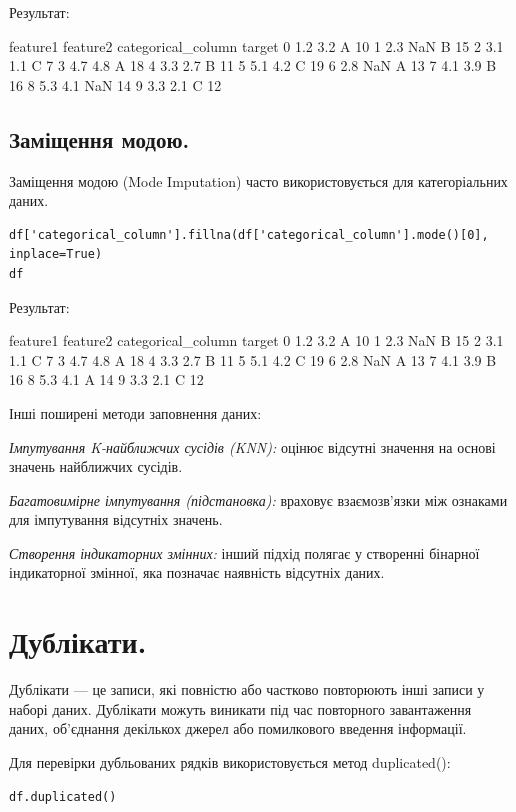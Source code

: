 Результат:

\begin{console}
	feature1	feature2	categorical_column	target
0	1.2	3.2	A	10
1	2.3	NaN	B	15
2	3.1	1.1	C	7
3	4.7	4.8	A	18
4	3.3	2.7	B	11
5	5.1	4.2	C	19
6	2.8	NaN	A	13
7	4.1	3.9	B	16
8	5.3	4.1	NaN	14
9	3.3	2.1	C	12
\end{console}

\subsection{Заміщення модою.} 

Заміщення модою (Mode Imputation) часто використовується для категоріальних даних.

\begin{lstlisting}
df['categorical_column'].fillna(df['categorical_column'].mode()[0], inplace=True)
df
\end{lstlisting}

Результат:

\begin{console}
feature1	feature2	categorical_column	target
0	1.2	3.2	A	10
1	2.3	NaN	B	15
2	3.1	1.1	C	7
3	4.7	4.8	A	18
4	3.3	2.7	B	11
5	5.1	4.2	C	19
6	2.8	NaN	A	13
7	4.1	3.9	B	16
8	5.3	4.1	A	14
9	3.3	2.1	C	12
\end{console}

 Інші поширені методи заповнення даних:

\textit{Імпутування K-найближчих сусідів (KNN):} оцінює відсутні значення на основі значень найближчих 
сусідів.

\textit{Багатовимірне імпутування (підстановка):} враховує взаємозв'язки між ознаками для імпутування 
відсутніх значень.

\textit{Створення індикаторних змінних:} інший підхід полягає у створенні бінарної індикаторної 
змінної, яка позначає наявність відсутніх даних.


\section{Дублікати.}

Дублікати — це записи, які повністю або частково повторюють інші записи у наборі даних. Дублікати можуть виникати під час повторного завантаження даних, об'єднання декількох джерел або помилкового введення інформації.

Для перевірки дубльованих рядків використовується метод duplicated():

\begin{lstlisting}
df.duplicated()
\end{lstlisting}

